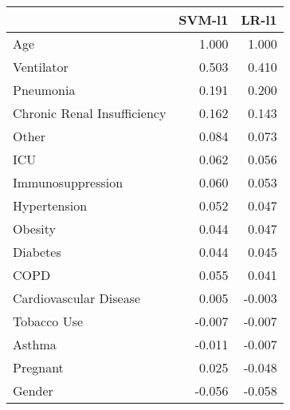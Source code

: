 \begin{tabular}{lrr}
\toprule
{} &  SVM-l1 &  LR-l1 \\
\midrule
Age                         &   1.000 &  1.000 \\
Ventilator                  &   0.503 &  0.410 \\
Pneumonia                   &   0.191 &  0.200 \\
Chronic Renal Insufficiency &   0.162 &  0.143 \\
Other                       &   0.084 &  0.073 \\
ICU                         &   0.062 &  0.056 \\
Immunosuppression           &   0.060 &  0.053 \\
Hypertension                &   0.052 &  0.047 \\
Obesity                     &   0.044 &  0.047 \\
Diabetes                    &   0.044 &  0.045 \\
COPD                        &   0.055 &  0.041 \\
Cardiovascular Disease      &   0.005 & -0.003 \\
Tobacco Use                 &  -0.007 & -0.007 \\
Asthma                      &  -0.011 & -0.007 \\
Pregnant                    &   0.025 & -0.048 \\
Gender                      &  -0.056 & -0.058 \\
\bottomrule
\end{tabular}
